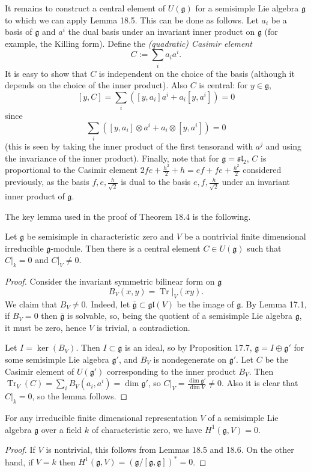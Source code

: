 It remains to construct a central element of $U(\mathfrak g)$ for a semisimple Lie algebra $\mathfrak g$ to which we can apply Lemma 18.5. This can be done as follows. Let $a_i$ be a basis of $\mathfrak g$ and $a^i$ the dual basis under an invariant inner product on $\mathfrak g$ (for example, the Killing form). Define the \emph{(quadratic) Casimir element}
\[
C:=\sum_i a_i a^i.
\]
It is easy to show that $C$ is independent on the choice of the basis (although it depends on the choice of the inner product). Also $C$ is central: for $y\in\mathfrak g$,
\[
[y,C]=\sum_i([y,a_i]a^i+a_i[y,a^i])=0
\]
since
\[
\sum_i([y,a_i]\otimes a^i+a_i\otimes[y,a^i])=0
\]
(this is seen by taking the inner product of the first tensorand with $a^j$ and using the invariance of the inner product). Finally, note that for $\mathfrak g=\mathfrak{sl}_2$, $C$ is proportional to the Casimir element $2fe+\frac{h^2}{2}+h=ef+fe+\frac{h^2}{2}$ considered previously, as the basis $f,e,\frac h{\sqrt2}$ is dual to the basis $e,f,\frac h{\sqrt2}$ under an invariant inner product of $\mathfrak g$.

The key lemma used in the proof of Theorem 18.4 is the following.
\begin{lemma}[18.6]
Let $\mathfrak g$ be semisimple in characteristic zero and $V$ be a nontrivial finite dimensional irreducible $\mathfrak g$-module. Then there is a central element $C\in U(\mathfrak g)$ such that $C|_k=0$ and $C|_V\ne0$.
\end{lemma}
\begin{proof}
Consider the invariant symmetric bilinear form on $\mathfrak g$
\[
B_V(x,y)=\operatorname{Tr}|_V(xy).
\]
We claim that $B_V\ne0$. Indeed, let $\overline{\mathfrak g}\subset\mathfrak{gl}(V)$ be the image of $\mathfrak g$. By Lemma 17.1, if $B_V=0$ then $\overline{\mathfrak g}$ is solvable, so, being the quotient of a semisimple Lie algebra $\mathfrak g$, it must be zero, hence $V$ is trivial, a contradiction.

Let $I=\ker(B_V)$. Then $I\subset\mathfrak g$ is an ideal, so by Proposition 17.7, $\mathfrak g=I\oplus\mathfrak g'$ for some semisimple Lie algebra $\mathfrak g'$, and $B_V$ is nondegenerate on $\mathfrak g'$. Let $C$ be the Casimir element of $U(\mathfrak g')$ corresponding to the inner product $B_V$. Then $\operatorname{Tr}_V(C)=\sum_i B_V(a_i,a^i)=\dim\mathfrak g'$, so $C|_V=\frac{\dim\mathfrak g'}{\dim V}\ne0$. Also it is clear that $C|_k=0$, so the lemma follows.
\end{proof}

\begin{corollary}[18.7]
For any irreducible finite dimensional representation $V$ of a semisimple Lie algebra $\mathfrak g$ over a field $k$ of characteristic zero, we have $H^1(\mathfrak g,V)=0$.
\end{corollary}
\begin{proof}
If $V$ is nontrivial, this follows from Lemmas 18.5 and 18.6. On the other hand, if $V=k$ then $H^1(\mathfrak g,V)=(\mathfrak g/[\mathfrak g,\mathfrak g])^*=0$.
\end{proof}

